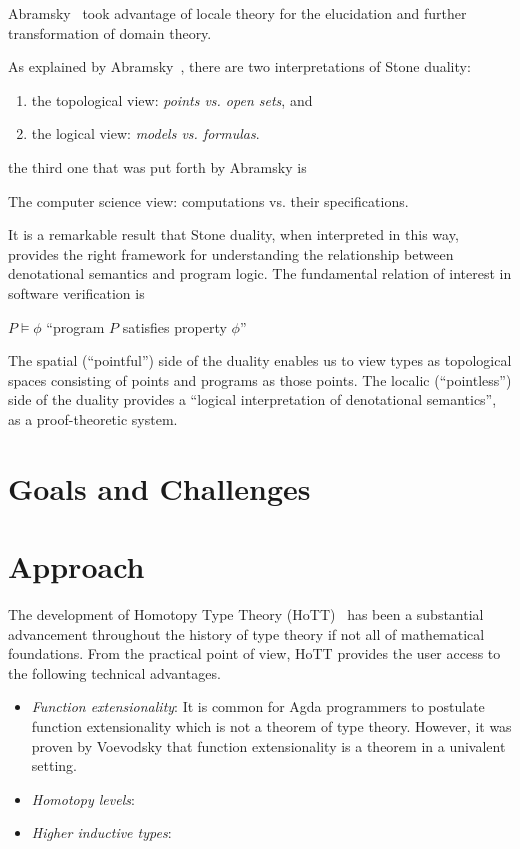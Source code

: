 \documentclass{article}
\begin{document}
Abramsky~\cite{abramsky:1991} took advantage of locale theory for the elucidation and
further transformation of domain theory.

As explained by Abramsky~\cite{abramsky:1991}, there are two interpretations of Stone
duality:
\begin{enumerate}
  \item the topological view: \emph{points vs. open sets}, and
  \item the logical view: \emph{models vs. formulas}.
\end{enumerate}
the third one that was put forth by Abramsky is
\begin{center}
  The computer science view: computations vs. their specifications.
\end{center}

It is a remarkable result that Stone duality, when interpreted in this way, provides the
right framework for understanding the relationship between denotational semantics and
program logic. The fundamental relation of interest in software verification is

\begin{center}
  $P \vDash \phi$ \qquad ``program $P$ satisfies property $\phi$''
\end{center}

The spatial (``pointful'') side of the duality enables us to view types as topological
spaces consisting of points and programs as those points. The localic (``pointless'') side
of the duality provides a ``logical interpretation of denotational semantics'', as a
proof-theoretic system.

\section{Goals and Challenges}

\section{Approach}

The development of Homotopy Type Theory (HoTT)~\cite{hottbook} has been a substantial
advancement throughout the history of type theory if not all of mathematical foundations.
From the practical point of view, HoTT provides the user access to the following technical
advantages.

\begin{itemize}
  \item \emph{Function extensionality}: It is common for Agda programmers to postulate
    function extensionality which is not a theorem of type theory. However, it was proven
    by Voevodsky that function extensionality is a theorem in a univalent setting.
  \item \emph{Homotopy levels}:
  \item \emph{Higher inductive types}:
\end{itemize}
\end{document}

